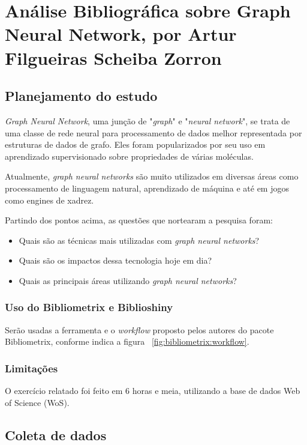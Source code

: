 \chapter{Análise Bibliográfica sobre Graph Neural Network, por Artur Filgueiras Scheiba Zorron\label{chap:bibliometria:titofrota}}

\section{Planejamento do estudo}

\textit{Graph Neural Network}, uma junção de "\textit{graph}" e "\textit{neural network}", se trata de uma classe de rede neural para processamento de dados melhor representada por estruturas de dados de grafo. Eles foram popularizados por seu uso em aprendizado supervisionado sobre propriedades de várias moléculas.

Atualmente, \textit{graph neural networks} são muito utilizados em diversas áreas como processamento de linguagem natural, aprendizado de máquina e até em jogos como engines de xadrez.

Partindo dos pontos acima, as questões que nortearam a pesquisa foram:
\begin{itemize}
    \item Quais são as técnicas mais utilizadas com \textit{graph neural networks}?
    \item Quais são os impactos dessa tecnologia hoje em dia?
    \item Quais as principais áreas utilizando \textit{graph neural networks}?
\end{itemize}

\subsection{Uso do Bibliometrix e Biblioshiny}
Serão usadas a ferramenta e o \textit{workflow} proposto pelos autores do pacote Bibliometrix, conforme indica a figura ~\ref{fig:bibliometrix:workflow}.

\subsection{Limitações} O exercício relatado foi feito em 6 horas e meia, utilizando a base de dados Web of Science (WoS).


\section{Coleta de dados\label{MASSA:coleta}}

